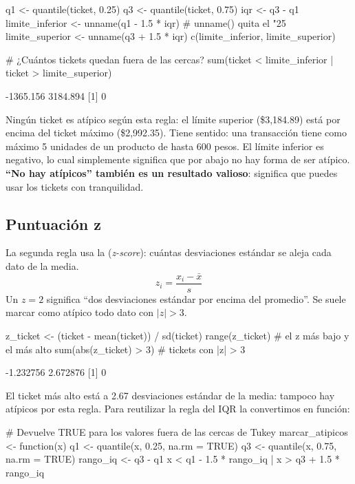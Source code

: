 \begin{rcode}
q1  <- quantile(ticket, 0.25)
q3  <- quantile(ticket, 0.75)
iqr <- q3 - q1
limite_inferior <- unname(q1 - 1.5 * iqr)   # unname() quita el "25%
limite_superior <- unname(q3 + 1.5 * iqr)
c(limite_inferior, limite_superior)

# ¿Cuántos tickets quedan fuera de las cercas?
sum(ticket < limite_inferior | ticket > limite_superior)
\end{rcode}
\begin{rsalida}
[1] -1365.156  3184.894
[1] 0
\end{rsalida}

Ningún ticket es atípico según esta regla: el límite superior (\$3,184.89)
está por encima del ticket máximo (\$2,992.35). Tiene sentido: una transacción
tiene como máximo 5 unidades de un producto de hasta 600 pesos. El límite
inferior es negativo, lo cual simplemente significa que por abajo no hay
forma de ser atípico. \textbf{``No hay atípicos'' también es un resultado
valioso}: significa que puedes usar los tickets con tranquilidad.

\subsection{Puntuación z}

La segunda regla usa la  (\emph{z-score}): cuántas
desviaciones estándar se aleja cada dato de la media.
\[
  z_i = \frac{x_i - \bar{x}}{s}
\]
Un $z = 2$ significa ``dos desviaciones estándar por encima del promedio''.
Se suele marcar como atípico todo dato con $|z| > 3$.

\begin{rcode}
z_ticket <- (ticket - mean(ticket)) / sd(ticket)
range(z_ticket)              # el z más bajo y el más alto
sum(abs(z_ticket) > 3)       # tickets con |z| > 3
\end{rcode}
\begin{rsalida}
[1] -1.232756  2.672876
[1] 0
\end{rsalida}

El ticket más alto está a 2.67 desviaciones estándar de la media: tampoco hay
atípicos por esta regla. Para reutilizar la regla del IQR la convertimos en
función:

\begin{rcode}
# Devuelve TRUE para los valores fuera de las cercas de Tukey
marcar_atipicos <- function(x) {
  q1 <- quantile(x, 0.25, na.rm = TRUE)
  q3 <- quantile(x, 0.75, na.rm = TRUE)
  rango_iq <- q3 - q1
  x < q1 - 1.5 * rango_iq | x > q3 + 1.5 * rango_iq
}
\end{rcode}

